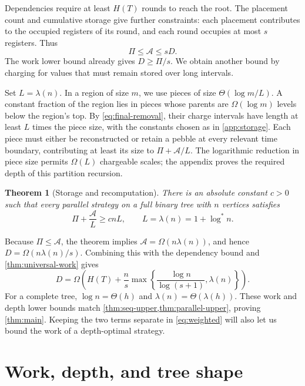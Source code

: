 \documentclass[11pt]{article}
\newtheorem{theorem}{Theorem}[section]
\theoremstyle{definition}
\theoremstyle{remark}
\newcommand{\Area}{\mathcal A}
\begin{document}
Dependencies require at least $H(T)$ rounds to reach the root. The placement count and cumulative storage give further constraints: each placement contributes to the occupied registers of its round, and each round occupies at most $s$ registers. Thus
\begin{equation}
\Pi\le\Area\le sD.
\label{eq:capacity}
\end{equation}
The work lower bound already gives $D\ge\Pi/s$. We obtain another bound by charging for values that must remain stored over long intervals.

Set $L=\lambda(n)$. In a region of size $m$, we use pieces of size $\Theta(\log m/L)$. A constant fraction of the region lies in pieces whose parents are $\Omega(\log m)$ levels below the region's top. By \cref{eq:final-removal}, their charge intervals have length at least $L$ times the piece size, with the constants chosen as in \cref{app:storage}. Each piece must either be reconstructed or retain a pebble at every relevant time boundary, contributing at least its size to $\Pi+\Area/L$. The logarithmic reduction in piece size permits $\Omega(L)$ chargeable scales; the appendix proves the required depth of this partition recursion.

\begin{theorem}[Storage and recomputation]
\label{thm:weighted}
There is an absolute constant $c>0$ such that every parallel strategy on a full binary tree with $n$ vertices satisfies
\begin{equation}
\Pi+\frac{\Area}{L}\ge cnL, \qquad L=\lambda(n)=1+\log^*n.
\label{eq:weighted}
\end{equation}
\end{theorem}

Because $\Pi\le\Area$, the theorem implies $\Area=\Omega(n\lambda(n))$, and hence $D=\Omega(n\lambda(n)/s)$. Combining this with the dependency bound and \cref{thm:universal-work} gives
\begin{equation}
D=\Omega\!\left(H(T)+\frac ns\max\!\left\{\frac{\log n}{\log(s+1)},\lambda(n)\right\}\right).
\label{eq:universal-depth}
\end{equation}
For a complete tree, $\log n=\Theta(h)$ and $\lambda(n)=\Theta(\lambda(h))$. These work and depth lower bounds match \cref{thm:seq-upper,thm:parallel-upper}, proving \cref{thm:main}. Keeping the two terms separate in \cref{eq:weighted} will also let us bound the work of a depth-optimal strategy.

\section{Work, depth, and tree shape}
\end{document}
